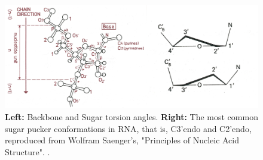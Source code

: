 \begin{figure}
\centering
\includegraphics[scale=1.8, angle=0]{Chapter1/torsions.png}
\caption{\textbf{Left:}      Backbone      and      Sugar      torsion
  angles. \textbf{Right:}  The most common  sugar pucker conformations
  in  RNA,  that is,  C3'endo  and  C2'endo,  reproduced from  Wolfram
  Saenger's,         "Principles        of         Nucleic        Acid
  Structure". \cite{saenger1984}.}
\label{fig:puckersbbone}
\end{figure}  




